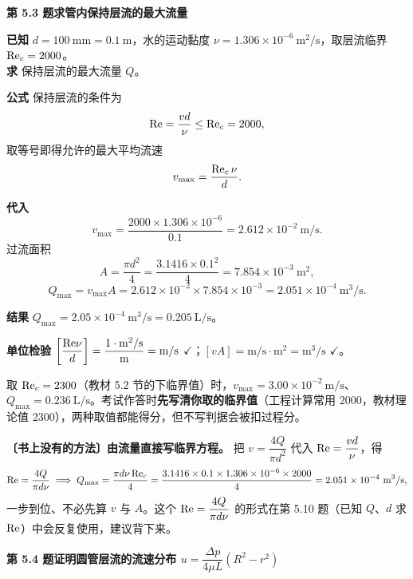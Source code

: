\noindent\textbf{第 5.3 题\quad 求管内保持层流的最大流量}

\begin{jie}
\textbf{已知} $d=100\ \mathrm{mm}=0.1\ \mathrm{m}$，水的运动黏度 $\nu=1.306\times10^{-6}\ \mathrm{m^2/s}$，取层流临界 $\mathrm{Re}_c=2000$。\\
\textbf{求} 保持层流的最大流量 $Q$。

\textbf{公式} 保持层流的条件为
\[\mathrm{Re}=\frac{vd}{\nu}\le \mathrm{Re}_c=2000,\]
取等号即得允许的最大平均流速
\[v_{\max}=\frac{\mathrm{Re}_c\,\nu}{d}.\]

\textbf{代入}
\[v_{\max}=\frac{2000\times1.306\times10^{-6}}{0.1}=2.612\times10^{-2}\ \mathrm{m/s}.\]
过流面积
\[A=\frac{\pi d^2}{4}=\frac{3.1416\times0.1^2}{4}=7.854\times10^{-3}\ \mathrm{m^2},\]
\[Q_{\max}=v_{\max}A=2.612\times10^{-2}\times7.854\times10^{-3}=2.051\times10^{-4}\ \mathrm{m^3/s}.\]

\textbf{结果} $\boxed{Q_{\max}=2.05\times10^{-4}\ \mathrm{m^3/s}=0.205\ \mathrm{L/s}}$。

\textbf{单位检验} $\left[\dfrac{\mathrm{Re}\nu}{d}\right]=\dfrac{1\cdot\mathrm{m^2/s}}{\mathrm{m}}=\mathrm{m/s}$ $\checkmark$；$[vA]=\mathrm{m/s}\cdot\mathrm{m^2}=\mathrm{m^3/s}$ $\checkmark$。
\end{jie}
\begin{yicuo}
取 $\mathrm{Re}_c=2300$（教材 5.2 节的下临界值）时，$v_{\max}=3.00\times10^{-2}\ \mathrm{m/s}$、$Q_{\max}=0.236\ \mathrm{L/s}$。考试作答时\textbf{先写清你取的临界值}（工程计算常用 2000，教材理论值 2300），两种取值都能得分，但不写判据会被扣过程分。
\end{yicuo}
\begin{banfa}
\textbf{〔书上没有的方法〕由流量直接写临界方程。} 把 $v=\dfrac{4Q}{\pi d^2}$ 代入 $\mathrm{Re}=\dfrac{vd}{\nu}$，得
\[\Rey=\frac{4Q}{\pi d\nu}\;\Longrightarrow\;Q_{\max}=\frac{\pi d\nu\,\Rey_c}{4}
=\frac{3.1416\times0.1\times1.306\times10^{-6}\times2000}{4}=2.051\times10^{-4}\ \mathrm{m^3/s},\]
一步到位、不必先算 $v$ 与 $A$。这个 $\mathrm{Re}=\dfrac{4Q}{\pi d\nu}$ 的形式在第 5.10 题（已知 $Q$、$d$ 求 $\mathrm{Re}$）中会反复使用，建议背下来。
\end{banfa}

\noindent\textbf{第 5.4 题\quad 证明圆管层流的流速分布 $u=\dfrac{\Delta p}{4\mu L}\left(R^2-r^2\right)$}

